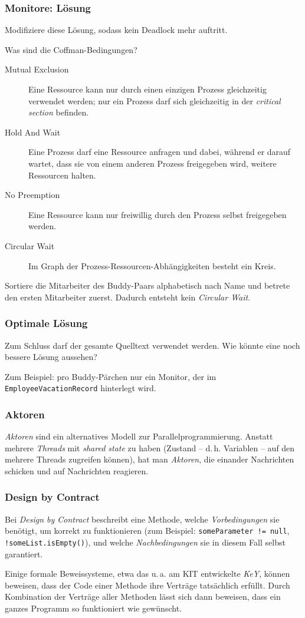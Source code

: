 \documentclass{beamer}
\begin{document}
\begin{frame}
  \frametitle{Monitore: Lösung}
  Modifiziere diese Lösung, sodass kein Deadlock mehr auftritt.
  
  Was sind die Coffman-Bedingungen?
  \pause
  \begin{description}
  \item[Mutual Exclusion]
    Eine Ressource kann nur durch einen einzigen Prozess gleichzeitig verwendet werden;
    nur ein Prozess darf sich gleichzeitig in der \emph{critical section} befinden.
  \item[Hold And Wait]
    Eine Prozess darf eine Ressource anfragen und dabei, während er darauf wartet, dass sie von einem anderen Prozess freigegeben wird, weitere Ressourcen halten.
  \item[No Preemption]
    Eine Ressource kann nur freiwillig durch den Prozess selbst freigegeben werden.
  \item[Circular Wait]
    Im Graph der Prozess-Ressourcen-Abhängigkeiten besteht ein Kreis.
  \end{description}
  
  \pause
  Sortiere die Mitarbeiter des Buddy-Paars alphabetisch nach Name
  und betrete den ersten Mitarbeiter zuerst.
  Dadurch entsteht kein \emph{Circular Wait}.
\end{frame}

\begin{frame}
  \frametitle{Optimale Lösung}
  Zum Schluss darf der gesamte Quelltext verwendet werden.
  Wie könnte eine noch bessere Lösung aussehen?
  
  \pause
  Zum Beispiel: pro Buddy-Pärchen nur ein Monitor,
  der im \lstinline{EmployeeVacationRecord} hinterlegt wird.
\end{frame}

\begin{frame}
  \frametitle{Aktoren}
  \emph{Aktoren} sind ein alternatives Modell zur Parallelprogrammierung.
  Anstatt mehrere \emph{Threads} mit \emph{shared state} zu haben
  (Zustand – d.\,h. Variablen – auf den mehrere Threads zugreifen können),
  hat man \emph{Aktoren}, die einander Nachrichten schicken und auf Nachrichten reagieren.
\end{frame}

\begin{frame}
  \frametitle{Design by Contract}
  Bei \emph{Design by Contract} beschreibt eine Methode,
  welche \emph{Vorbedingungen} sie benötigt, um korrekt zu funktionieren
  (zum Beispiel: \lstinline{someParameter != null}, \lstinline{!someList.isEmpty()}),
  und welche \emph{Nachbedingungen} sie in diesem Fall selbst garantiert.
  
  Einige formale Beweissysteme,
  etwa das u.\,a. am KIT entwickelte \emph{KeY},
  können beweisen, dass der Code einer Methode ihre Verträge tatsächlich erfüllt.
  Durch Kombination der Verträge aller Methoden lässt sich dann beweisen,
  dass ein ganzes Programm so funktioniert wie gewünscht.
\end{frame}
\end{document}
